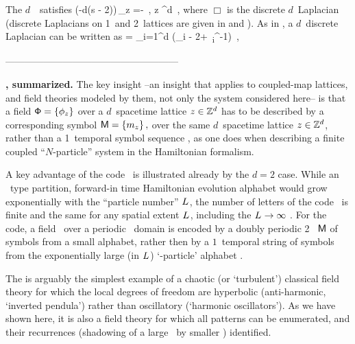      {

The $d$\dmn\ \catlatt\ satisfies {\sPe} 
\beq
(\Box -d(s - 2))\,\ssp_{z} =-
\,,\qquad
{z} \in \integers^d
\,,
where $\Box$ is the discrete $d$\dmn\ Laplacian
(discrete Laplacians on 1\dmn\ and 2\dmn\ lattices are given in
 and ). As in , a
$d$\dmn\ discrete Laplacian can be written as
\beq
\Box = \sum_{i=1}^{d} (\hopMat_{i}  - 2\unit + \hopMat_{i}^{-1})
\,,
    }


------------------------------------------------------

\bigskip

\noindent\textbf{\catLatt, summarized.}
The
key insight --an insight that applies to coupled-map
lattices, and field theories
modeled by them, not only the system considered here-- is that a field
\(
\Xx=\{\ssp_{z}\} %
\)
over a $d$\dmn\ spacetime lattice $z\in \mathbb{Z}^{d}$ has to be
described by a corresponding symbol {\brick}
\(
\Mm=\{\m_{z}\} %
\,,
\)
over the same $d$\dmn\ spacetime  lattice $z\in \mathbb{Z}^{d}$, rather
than a 1\dmn\ temporal symbol sequence , as one does when
describing a finite coupled ``$N$-particle'' system in the Hamiltonian
formalism.

A key advantage of the {\spt} code \Mm\ is illustrated already by the $d=2$
case. While an \AW\ type partition, forward-in time Hamiltonian evolution
alphabet would grow exponentially with the
``particle number'' ${L_{}}$, the number of letters
 of the {\spt} code \A\ is finite and the same for any
spatial extent
${L_{}}$, including the ${L_{}}\to\infty$ \catlatt. For the
{\spt} code, a field \Xx\ over a periodic \spt\ domain is encoded by a
doubly periodic 2\dmn\ {\brick} $\mathsf{M}$ of symbols from a small alphabet,
rather then by a $1$\dmn\ temporal string of symbols from the
exponentially large (in ${L_{}}$) `\speriod{}-particle' alphabet
\Aa.

The
{\catlatt} is arguably the simplest example of a chaotic (or `turbulent')
classical field theory for which the local degrees of freedom are
hyperbolic (anti-harmonic, `inverted pendula') rather than oscillatory
(`harmonic oscillators'). As we have shown here, it is also a field theory
for which all {\admissible} {\spt} patterns can be enumerated, and their
recurrences (shadowing of a large \twot\ by smaller \twots) identified.
